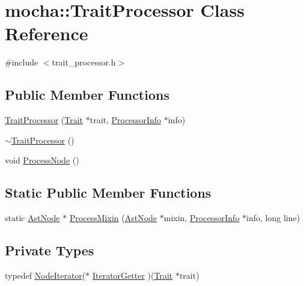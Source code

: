 \hypertarget{classmocha_1_1_trait_processor}{
\section{mocha::TraitProcessor Class Reference}
\label{classmocha_1_1_trait_processor}
}


{\ttfamily \#include $<$trait\_\-processor.h$>$}

\subsection*{Public Member Functions}
\begin{DoxyCompactItemize}
\item 
\hyperlink{classmocha_1_1_trait_processor_ae38c5ff2f28feaa6cea6c60e6c5bc3cd}{TraitProcessor} (\hyperlink{classmocha_1_1_trait}{Trait} $\ast$trait, \hyperlink{classmocha_1_1_processor_info}{ProcessorInfo} $\ast$info)
\item 
\hyperlink{classmocha_1_1_trait_processor_a2fb88cfb4c31f32ae1de8f99bfdb5e98}{$\sim$TraitProcessor} ()
\item 
void \hyperlink{classmocha_1_1_trait_processor_a01446e414e34d9f767199f52d9664834}{ProcessNode} ()
\end{DoxyCompactItemize}
\subsection*{Static Public Member Functions}
\begin{DoxyCompactItemize}
\item 
static \hyperlink{classmocha_1_1_ast_node}{AstNode} $\ast$ \hyperlink{classmocha_1_1_trait_processor_ae2a0fac54c740889182958f3f62a7e30}{ProcessMixin} (\hyperlink{classmocha_1_1_ast_node}{AstNode} $\ast$mixin, \hyperlink{classmocha_1_1_processor_info}{ProcessorInfo} $\ast$info, long line)
\end{DoxyCompactItemize}
\subsection*{Private Types}
\begin{DoxyCompactItemize}
\item 
typedef \hyperlink{classmocha_1_1_node_iterator}{NodeIterator}($\ast$ \hyperlink{classmocha_1_1_trait_processor_af7805e506418889e29cefb8f5c23c4a9}{IteratorGetter} )(\hyperlink{classmocha_1_1_trait}{Trait} $\ast$trait)
\end{DoxyCompactItemize}
